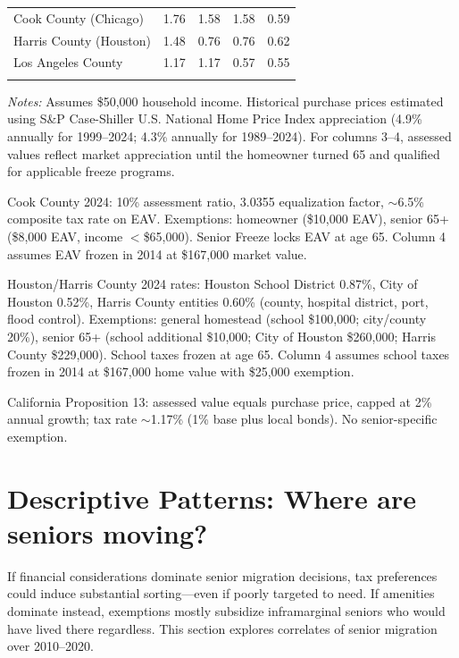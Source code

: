 \documentclass[11pt]{article}
\begin{document}
\begin{table}[htbp!]
\begin{threeparttable}
\begin{tabular}{@{}lrrrr@{}}
    \addlinespace[0.3em]
    Cook County (Chicago) & 1.76 & 1.58 & 1.58 & 0.59 \\
    Harris County (Houston) & 1.48 & 0.76 & 0.76 & 0.62 \\
    Los Angeles County & 1.17 & 1.17 & 0.57 & 0.55 \\
    \addlinespace[0.3em]
    \bottomrule
    \end{tabular}
    \begin{tablenotes}[flushleft]
    \footnotesize
    \item \textit{Notes:} Assumes \$50,000 household income. Historical purchase prices estimated using S\&P Case-Shiller U.S. National Home Price Index appreciation (4.9\% annually for 1999--2024; 4.3\% annually for 1989--2024). For columns 3--4, assessed values reflect market appreciation until the homeowner turned 65 and qualified for applicable freeze programs.
    \item[a] Cook County 2024: 10\% assessment ratio, 3.0355 equalization factor, $\sim$6.5\% composite tax rate on EAV. Exemptions: homeowner (\$10,000 EAV), senior 65+ (\$8,000 EAV, income $<$\$65,000). Senior Freeze locks EAV at age 65. Column 4 assumes EAV frozen in 2014 at \$167,000 market value.
    \item[b] Houston/Harris County 2024 rates: Houston School District 0.87\%, City of Houston 0.52\%, Harris County entities 0.60\% (county, hospital district, port, flood control). Exemptions: general homestead (school \$100,000; city/county 20\%), senior 65+ (school additional \$10,000; City of Houston \$260,000; Harris County \$229,000). School taxes frozen at age 65. Column 4 assumes school taxes frozen in 2014 at \$167,000 home value with \$25,000 exemption.
    \item[c] California Proposition 13: assessed value equals purchase price, capped at 2\% annual growth; tax rate $\sim$1.17\% (1\% base plus local bonds). No senior-specific exemption.
    \end{tablenotes}
    \end{threeparttable}
    \end{table}

\section{Descriptive Patterns: Where are seniors moving?}
If financial considerations dominate senior migration decisions, tax preferences could induce substantial sorting—even if poorly targeted to need. If amenities dominate instead, exemptions mostly subsidize inframarginal seniors who would have lived there regardless. This section explores correlates of senior migration over 2010–2020.
\end{document}
